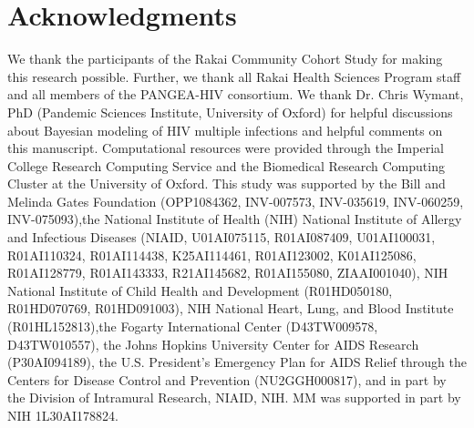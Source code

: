 \documentclass[10pt,letterpaper]{article}
\begin{document}
\section*{Acknowledgments}
We thank the participants of the Rakai Community Cohort Study for making this research possible. Further, we thank all Rakai Health Sciences Program staff and all members of the PANGEA-HIV consortium. We thank Dr. Chris Wymant, PhD (Pandemic Sciences Institute, University of Oxford) for helpful discussions about Bayesian modeling of HIV multiple infections and helpful comments on this manuscript. Computational resources were provided through the Imperial College Research Computing Service and the Biomedical Research Computing Cluster at the University of Oxford. This study was supported by the Bill and Melinda Gates Foundation (OPP1084362, INV-007573, INV-035619, INV-060259, INV-075093),the National Institute of Health (NIH) National Institute of Allergy and Infectious Diseases (NIAID, U01AI075115, R01AI087409, U01AI100031, R01AI110324, R01AI114438, K25AI114461, R01AI123002, K01AI125086, R01AI128779, R01AI143333, R21AI145682, R01AI155080, ZIAAI001040), NIH National Institute of Child Health and Development (R01HD050180, R01HD070769, R01HD091003), NIH National Heart, Lung, and Blood Institute (R01HL152813),the Fogarty International Center (D43TW009578, D43TW010557), the Johns Hopkins University Center for AIDS Research (P30AI094189), the U.S. President’s Emergency Plan for AIDS Relief through the Centers for Disease Control and Prevention (NU2GGH000817), and in part by the Division of Intramural Research, NIAID, NIH. MM was supported in part by NIH 1L30AI178824.  

\newpage
\end{document}
